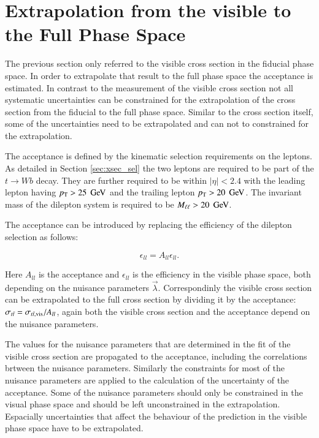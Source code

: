 \section{Extrapolation from the visible to the Full Phase Space}
\label{sec:xsec_extraction}

The previous section only referred to the visible cross section in the fiducial phase space. In order to extrapolate that result to the full phase space the acceptance
is estimated.
In contrast to the measurement of the visible cross section not all systematic uncertainties can be constrained for the extrapolation of the cross section from the fiducial to the full phase space.
Similar to the cross section itself, some of the uncertainties need to be extrapolated and can not to constrained for the extrapolation.

The acceptance is defined by the kinematic selection requirements on the leptons. As detailed in Section \ref{sec:xsec_sel} the two leptons are required to be part of the $t \rightarrow W b$ decay. They are further required to be within $|\eta|< 2.4$ with the 
leading lepton having $p_{\mathrm{T}} > 25 \; \,\text{Ge\hspace{-.08em}V}$ and the trailing lepton $p_{\mathrm{T}} > 20 \; \,\text{Ge\hspace{-.08em}V}$. The invariant mass of the dilepton system is required to be $M_{\ell\ell} > 20 \; \,\text{Ge\hspace{-.08em}V}$. 

The acceptance can be introduced by replacing the efficiency of the dilepton selection as follows:

\begin{equation}
\epsilon_{ll} = A_{ll} \epsilon_{ll}.
\label{eq:epsacc}
\end{equation}

Here $A_{ll}$ is the acceptance and $\epsilon_{ll}$ is the efficiency in the visible phase space, both depending on the nuisance parameters $\vec{\lambda}$.
Correspondinly the visible cross section can be extrapolated to the full cross section by dividing it by the acceptance: $\sigma_{t\bar{t}} = \sigma_{t\bar{t},\mathrm{vis}} / A_{ll}$, again both the visible cross section and the 
acceptance depend on the nuisance parameters.

The values for the nuisance parameters that are determined in the fit of the visible cross section are propagated to the acceptance, including the correlations brtween the nuisance parameters. 
Similarly the constraints for most of the nuisance parameters are applied to the calculation of the uncertainty of the acceptance.
Some of the nuisance parameters should only be constrained in the visual phase space and should be left unconstrained in the extrapolation.
Espacially uncertainties that affect the behaviour of the prediction in the visible phase space have to be extrapolated.

